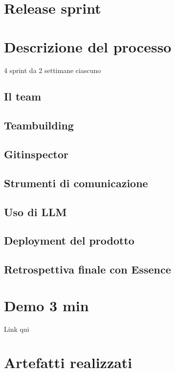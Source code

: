 \documentclass{article}
\begin{document}
\section{Release sprint}

\section{Descrizione del processo}

4 sprint da 2 settimane ciascuno

\subsection{Il team}

\subsection{Teambuilding}

\subsection{Gitinspector}

\subsection{Strumenti di comunicazione}

\subsection{Uso di LLM}

\subsection{Deployment del prodotto}

\subsection{Retrospettiva finale con Essence}

\section{Demo 3 min}
Link qui

\section{Artefatti realizzati}
\end{document}
